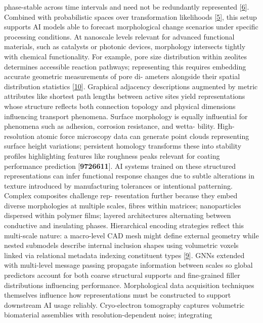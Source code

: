 \documentclass[
]{article}
\begin{document}
phase-stable across time intervals and need not be redundantly
represented {[}\protect\hyperlink{_bookmark46}{6}{]}. Combined with
probabilistic spaces over transformation likelihoods
{[}\protect\hyperlink{_bookmark45}{5}{]}, this setup supports AI models
able to forecast morphological change scenarios under specific
processing conditions. At nanoscale levels relevant for advanced
functional materials, such as catalysts or photonic devices, morphology
intersects tightly with chemical functionality. For example, pore size
distribution within zeolites determines accessible reaction pathways;
representing this requires embedding accurate geometric measurements of
pore di- ameters alongside their spatial distribution statistics
{[}\protect\hyperlink{_bookmark50}{10}{]}. Graphical adjacency
descriptions augmented by metric attributes like shortest path lengths
between active sites yield representations whose structure reflects both
connection topology and physical dimensions influencing transport
phenomena. Surface morphology is equally influential for phenomena such
as adhesion, corrosion resistance, and wetta- bility. High-resolution
atomic force microscopy data can generate point clouds representing
surface height variations; persistent homology transforms these into
stability profiles highlighting features like roughness peaks relevant
for coating performance prediction {[}\textbf{9726611}{]}. AI systems
trained on these structured representations can infer functional
response changes due to subtle alterations in texture introduced by
manufacturing tolerances or intentional patterning. Complex composites
challenge rep- resentation further because they embed diverse
morphologies at multiple scales, fibres within matrices; nanoparticles
dispersed within polymer films; layered architectures alternating
between conductive and insulating phases. Hierarchical encoding
strategies reflect this multi-scale nature: a macro-level CAD mesh might
define external geometry while nested submodels describe internal
inclusion shapes using volumetric voxels linked via relational metadata
indexing constituent types {[}\protect\hyperlink{_bookmark49}{9}{]}.
GNNs extended with multi-level message passing propagate information
between scales so global predictors account for both coarse structural
supports and fine-grained filler distributions influencing performance.
Morphological data acquisition techniques themselves influence how
representations must be constructed to support downstream AI usage
reliably. Cryo-electron tomography captures volumetric biomaterial
assemblies with resolution-dependent noise; integrating
\end{document}
